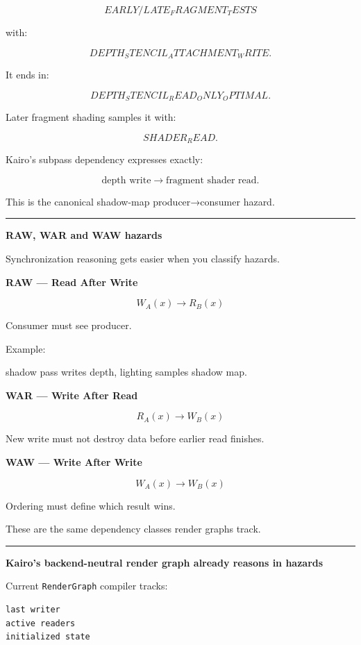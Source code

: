 \[
EARLY/LATE_FRAGMENT_TESTS
\]

with:

\[
DEPTH_STENCIL_ATTACHMENT_WRITE.
\]

It ends in:

\[
DEPTH_STENCIL_READ_ONLY_OPTIMAL.
\]

Later fragment shading samples it with:

\[
SHADER_READ.
\]

Kairo's subpass dependency expresses exactly:

\[
\text{depth write}
\rightarrow
\text{fragment shader read}.
\]

This is the canonical shadow-map producer→consumer hazard.

\begin{center}\rule{0.5\linewidth}{0.5pt}\end{center}

\textbf{RAW, WAR and WAW hazards}

Synchronization reasoning gets easier when you classify hazards.

\textbf{RAW --- Read After Write}

\[
W_A(x)
\rightarrow
R_B(x)
\]

Consumer must see producer.

Example:

shadow pass writes depth, lighting samples shadow map.

\textbf{WAR --- Write After Read}

\[
R_A(x)
\rightarrow
W_B(x)
\]

New write must not destroy data before earlier read finishes.

\textbf{WAW --- Write After Write}

\[
W_A(x)
\rightarrow
W_B(x)
\]

Ordering must define which result wins.

These are the same dependency classes render graphs track.

\begin{center}\rule{0.5\linewidth}{0.5pt}\end{center}

\textbf{Kairo's backend-neutral render graph already reasons in hazards}

Current \texttt{RenderGraph} compiler tracks:

\begin{verbatim}
last writer
active readers
initialized state
\end{verbatim}

